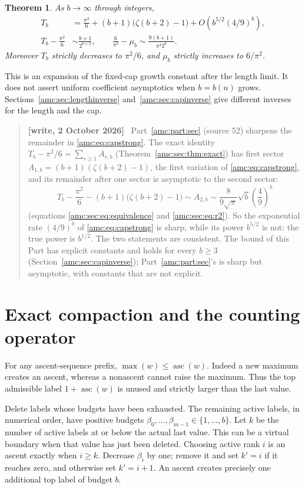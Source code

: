 \documentclass[11pt,letterpaper]{article}
\newtheorem{theorem}{Theorem}[section]
\theoremstyle{remark}\newtheorem{remark}[theorem]{Remark}
\newcommand{\asc}{\operatorname{asc}}
\newenvironment{writenote}{\par\smallskip\begin{quote}\small\textbf{[write, 2 October 2026]}\ }{\end{quote}\smallskip}
\begin{document}
\begin{theorem}\label{amc:thm:cap}
As $b\to\infty$ through integers,
\begin{align}
 T_b&=\frac{\pi^2}{6}+(b+1)\bigl(\zeta(b+2)-1\bigr)
       +O\!\left(b^{5/2}(4/9)^b\right),\label{amc:eq:capstrong}\\
 T_b-\frac{\pi^2}{6}&\sim\frac{b+1}{2^{b+2}},\qquad
 \frac6{\pi^2}-\mu_b\sim\frac{9(b+1)}{\pi^4 2^b}.\label{amc:eq:caplead}
\end{align}
Moreover $T_b$ strictly decreases to $\pi^2/6$, and $\mu_b$ strictly increases to $6/\pi^2$.
\end{theorem}
This is an expansion of the fixed-cap growth constant after the length limit. It does not assert uniform coefficient asymptotics when $b=b(n)$ grows. Sections~\ref{amc:sec:lengthinverse} and~\ref{amc:sec:capinverse} give different inverses for the length and the cap.
\begin{writenote}
Part~\ref{amc:part:sec} (source 52) sharpens the remainder in \eqref{amc:eq:capstrong}. The exact identity $T_b-\pi^2/6=\sum_{r\ge1}A_{r,b}$ (Theorem~\ref{amc:sec:thm:exact}) has first sector $A_{1,b}=(b+1)(\zeta(b+2)-1)$, the first variation of \eqref{amc:eq:capstrong}, and its remainder after one sector is asymptotic to the second sector:
\[
 T_b-\frac{\pi^2}{6}-(b+1)\bigl(\zeta(b+2)-1\bigr)\sim A_{2,b}\sim\frac8{9\sqrt\pi}\sqrt b\left(\frac49\right)^b
\]
(equations \eqref{amc:sec:eq:equivalence} and \eqref{amc:sec:eq:r2}). So the exponential rate $(4/9)^b$ of \eqref{amc:eq:capstrong} is sharp, while its power $b^{5/2}$ is not: the true power is $b^{1/2}$. The two statements are consistent. The bound of this Part has explicit constants and holds for every $b\ge3$ (Section~\ref{amc:sec:capinverse}); Part~\ref{amc:part:sec}'s is sharp but asymptotic, with constants that are not explicit.
\end{writenote}

\section{Exact compaction and the counting operator}\label{amc:sec:compaction}
For any ascent-sequence prefix, $\max(w)\le\asc(w)$. Indeed a new maximum creates an ascent, whereas a nonascent cannot raise the maximum. Thus the top admissible label $1+\asc(w)$ is unused and strictly larger than the last value.

Delete labels whose budgets have been exhausted. The remaining active labels, in numerical order, have positive budgets $\beta_0,\ldots,\beta_{m-1}\in\{1,\ldots,b\}$. Let $k$ be the number of active labels at or below the actual last value. This can be a virtual boundary when that value has just been deleted. Choosing active rank $i$ is an ascent exactly when $i\ge k$. Decrease $\beta_i$ by one; remove it and set $k'=i$ if it reaches zero, and otherwise set $k'=i+1$. An ascent creates precisely one additional top label of budget $b$.
\end{document}
